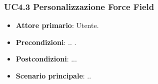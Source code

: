 \subsubsection{UC4.3 Personalizzazione Force Field}
\begin{itemize}
	\item \textbf{Attore primario}: Utente.
	\item \textbf{Precondizioni}: .. .
	\item \textbf{Postcondizioni}: ...
	\item \textbf{Scenario principale}: ..
\end{itemize}